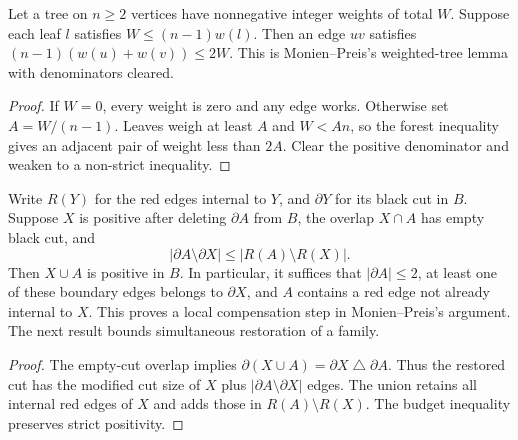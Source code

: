 \begin{theorem}
  \label{thm:lowerbounds-algebraic-weighted-tree-pair}
  \leanok
  Let a tree on $n\ge2$ vertices have nonnegative integer weights of
  total $W$. Suppose each leaf $l$ satisfies $W\le(n-1)w(l)$.
  Then an edge $uv$ satisfies $(n-1)(w(u)+w(v))\le2W$.
  This is Monien--Preis's weighted-tree lemma with denominators cleared.
\end{theorem}
\begin{proof}
  \leanok
  If $W=0$, every weight is zero and any edge works. Otherwise set
  $A=W/(n-1)$. Leaves weigh at least $A$ and $W<An$, so the forest
  inequality gives an adjacent pair of weight less than $2A$.
  Clear the positive denominator and weaken to a non-strict inequality.
\end{proof}

\begin{theorem}
  \label{thm:lowerbounds-algebraic-red-black-restoration}
  \leanok
  Write $R(Y)$ for the red edges internal to $Y$, and $\partial Y$
  for its black cut in $B$. Suppose $X$ is positive after deleting
  $\partial A$ from $B$, the overlap $X\cap A$ has empty black cut,
  and
  \[
    |\partial A\setminus\partial X|\le|R(A)\setminus R(X)|.
  \]
  Then $X\cup A$ is positive in $B$. In particular, it suffices that
  $|\partial A|\le2$, at least one of these boundary edges belongs
  to $\partial X$, and $A$ contains a red edge not already internal
  to $X$. This proves a local compensation step in Monien--Preis's
  argument. The next result bounds simultaneous restoration of a family.
\end{theorem}
\begin{proof}
  \leanok
  The empty-cut overlap implies
  $\partial(X\cup A)=\partial X\mathbin{\triangle}\partial A$.
  Thus the restored cut has the modified cut size of $X$ plus
  $|\partial A\setminus\partial X|$ edges. The union retains all
  internal red edges of $X$ and adds those in $R(A)\setminus R(X)$.
  The budget inequality preserves strict positivity.
\end{proof}

